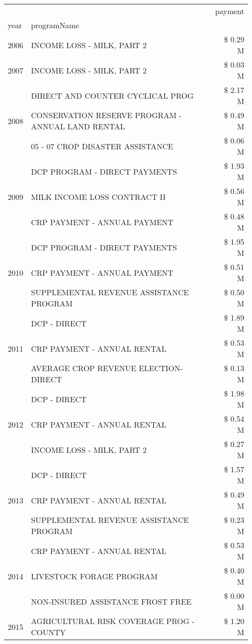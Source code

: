 \begin{tabular}{llr}
\toprule
 &  & payment \\
year & programName &  \\
\midrule
2006 & INCOME LOSS - MILK, PART 2 & \$ 0.29 M \\
\cline{1-3}
2007 & INCOME LOSS - MILK, PART 2 & \$ 0.03 M \\
\cline{1-3}
\multirow[t]{3}{*}{2008} & DIRECT AND COUNTER CYCLICAL PROG & \$ 2.17 M \\
 & CONSERVATION RESERVE PROGRAM - ANNUAL LAND RENTAL & \$ 0.49 M \\
 & 05 - 07 CROP DISASTER ASSISTANCE & \$ 0.06 M \\
\cline{1-3}
\multirow[t]{3}{*}{2009} & DCP PROGRAM - DIRECT PAYMENTS & \$ 1.93 M \\
 & MILK INCOME LOSS CONTRACT II & \$ 0.56 M \\
 & CRP PAYMENT - ANNUAL PAYMENT & \$ 0.48 M \\
\cline{1-3}
\multirow[t]{3}{*}{2010} & DCP PROGRAM - DIRECT PAYMENTS & \$ 1.95 M \\
 & CRP PAYMENT - ANNUAL PAYMENT & \$ 0.51 M \\
 & SUPPLEMENTAL REVENUE ASSISTANCE PROGRAM & \$ 0.50 M \\
\cline{1-3}
\multirow[t]{3}{*}{2011} & DCP - DIRECT & \$ 1.89 M \\
 & CRP PAYMENT - ANNUAL RENTAL & \$ 0.53 M \\
 & AVERAGE CROP REVENUE ELECTION-DIRECT & \$ 0.13 M \\
\cline{1-3}
\multirow[t]{3}{*}{2012} & DCP - DIRECT & \$ 1.98 M \\
 & CRP PAYMENT - ANNUAL RENTAL & \$ 0.54 M \\
 & INCOME LOSS - MILK, PART 2 & \$ 0.27 M \\
\cline{1-3}
\multirow[t]{3}{*}{2013} & DCP - DIRECT & \$ 1.57 M \\
 & CRP PAYMENT - ANNUAL RENTAL & \$ 0.49 M \\
 & SUPPLEMENTAL REVENUE ASSISTANCE PROGRAM & \$ 0.23 M \\
\cline{1-3}
\multirow[t]{3}{*}{2014} & CRP PAYMENT - ANNUAL RENTAL & \$ 0.53 M \\
 & LIVESTOCK FORAGE PROGRAM & \$ 0.40 M \\
 & NON-INSURED ASSISTANCE FROST FREE & \$ 0.00 M \\
\cline{1-3}
\multirow[t]{3}{*}{2015} & AGRICULTURAL RISK COVERAGE PROG - COUNTY & \$ 1.20 M \\

\end{tabular}
